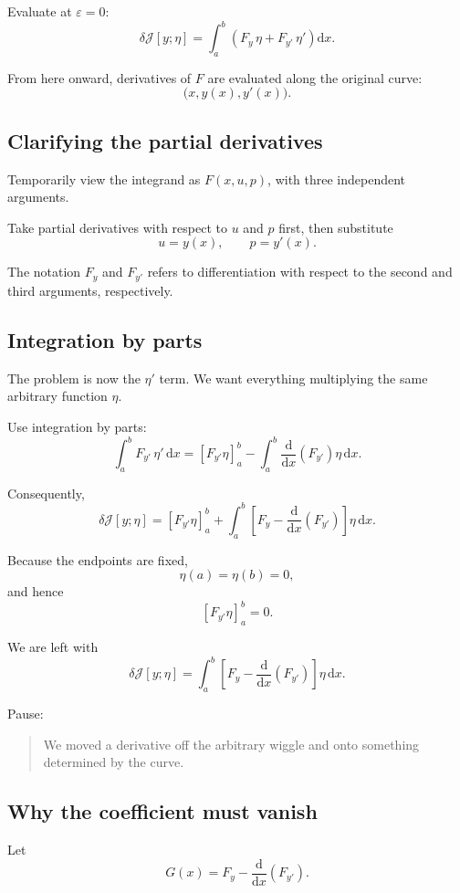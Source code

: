 \documentclass[11pt,a4paper]{article}
\newcommand{\dd}{\mathrm{d}}
\newcommand{\J}{\mathcal{J}}
\begin{document}
Evaluate at \(\varepsilon=0\):
\[
\boxed{
\delta\J[y;\eta]
=
\int_a^b
\left(
F_y\,\eta+F_{y'}\,\eta'
\right)\dd x.
}
\]

From here onward, derivatives of \(F\) are evaluated along the
original curve:
\[
\bigl(x,y(x),y'(x)\bigr).
\]

\subsection*{Clarifying the partial derivatives}

Temporarily view the integrand as \(F(x,u,p)\), with three
independent arguments.

Take partial derivatives with respect to \(u\) and \(p\) first,
then substitute
\[
u=y(x),
\qquad
p=y'(x).
\]

The notation \(F_y\) and \(F_{y'}\) refers to differentiation with
respect to the second and third arguments, respectively.

\subsection*{Integration by parts}

The problem is now the \(\eta'\) term.
We want everything multiplying the same arbitrary function \(\eta\).

Use integration by parts:
\[
\int_a^b F_{y'}\,\eta'\,\dd x
=
\left[F_{y'}\eta\right]_a^b
-
\int_a^b
\frac{\dd}{\dd x}\left(F_{y'}\right)\eta\,\dd x.
\]

Consequently,
\[
\delta\J[y;\eta]
=
\left[F_{y'}\eta\right]_a^b
+
\int_a^b
\left[
F_y-\frac{\dd}{\dd x}\left(F_{y'}\right)
\right]\eta\,\dd x.
\]

Because the endpoints are fixed,
\[
\eta(a)=\eta(b)=0,
\]
and hence
\[
\left[F_{y'}\eta\right]_a^b=0.
\]

We are left with
\[
\boxed{
\delta\J[y;\eta]
=
\int_a^b
\left[
F_y-\frac{\dd}{\dd x}\left(F_{y'}\right)
\right]\eta\,\dd x.
}
\]

Pause:
\begin{quote}
We moved a derivative off the arbitrary wiggle and onto something
determined by the curve.
\end{quote}

\subsection*{Why the coefficient must vanish}

Let
\[
G(x)
=
F_y-\frac{\dd}{\dd x}\left(F_{y'}\right).
\]
\end{document}
